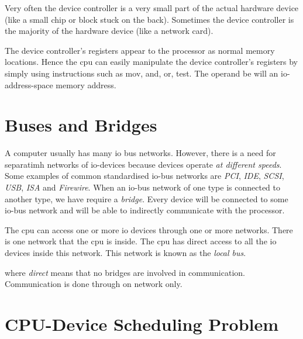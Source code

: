 Very often the device controller is a very small part of the actual hardware device 
(like a small chip or block stuck on the back). 
Sometimes the device controller is the majority of the hardware device 
(like a network card).


The device controller’s registers appear to the processor as normal memory locations. 
Hence the cpu can easily manipulate the device controller’s registers by simply 
using instructions such as mov, and, or, test. 
The operand be will an io-address-space memory address.

\section{Buses and Bridges}

A computer usually has many io bus networks. However, there is a need for separatimh networks 
of io-devices because devices operate \textit{at different speeds}. 
Some examples of common standardised io-bus networks are \textit{PCI}, 
\textit{IDE}, \textit{SCSI}, \textit{USB}, \textit{ISA} and \textit{Firewire}. 
When an io-bus network of one type is connected to another type, we have require a \textit{bridge}. 
Every device will be connected to some io-bus network and will be able to indirectly communicate with the processor. 

The cpu can access one or more io devices through one or more networks.
There is one network that the cpu is inside. The cpu has direct access to all the io devices 
inside this network. This network is known as the \textit{local bus}. 

where \textit{direct} means that no bridges are involved in communication. 
Communication is done through on network only. 

\section{CPU-Device Scheduling Problem}

